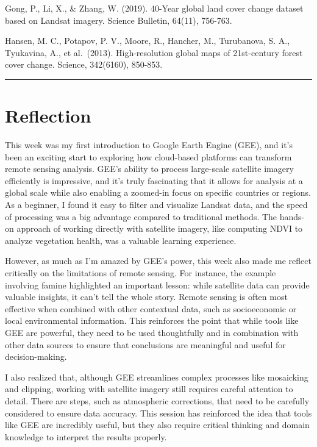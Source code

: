 \documentclass[
  letterpaper,
  DIV=11,
  numbers=noendperiod]{scrreprt}
\begin{document}
Gong, P., Li, X., \& Zhang, W. (2019). 40-Year global land cover change
dataset based on Landsat imagery. Science Bulletin, 64(11), 756-763.

Hansen, M. C., Potapov, P. V., Moore, R., Hancher, M., Turubanova, S.
A., Tyukavina, A., et al.~(2013). High-resolution global maps of
21st-century forest cover change. Science, 342(6160), 850-853.

\begin{center}\rule{0.5\linewidth}{0.5pt}\end{center}

\section{Reflection}\label{reflection-3}

This week was my first introduction to Google Earth Engine (GEE), and
it's been an exciting start to exploring how cloud-based platforms can
transform remote sensing analysis. GEE's ability to process large-scale
satellite imagery efficiently is impressive, and it's truly fascinating
that it allows for analysis at a global scale while also enabling a
zoomed-in focus on specific countries or regions. As a beginner, I found
it easy to filter and visualize Landsat data, and the speed of
processing was a big advantage compared to traditional methods. The
hands-on approach of working directly with satellite imagery, like
computing NDVI to analyze vegetation health, was a valuable learning
experience.

However, as much as I'm amazed by GEE's power, this week also made me
reflect critically on the limitations of remote sensing. For instance,
the example involving famine highlighted an important lesson: while
satellite data can provide valuable insights, it can't tell the whole
story. Remote sensing is often most effective when combined with other
contextual data, such as socioeconomic or local environmental
information. This reinforces the point that while tools like GEE are
powerful, they need to be used thoughtfully and in combination with
other data sources to ensure that conclusions are meaningful and useful
for decision-making.

I also realized that, although GEE streamlines complex processes like
mosaicking and clipping, working with satellite imagery still requires
careful attention to detail. There are steps, such as atmospheric
corrections, that need to be carefully considered to ensure data
accuracy. This session has reinforced the idea that tools like GEE are
incredibly useful, but they also require critical thinking and domain
knowledge to interpret the results properly.
\end{document}
